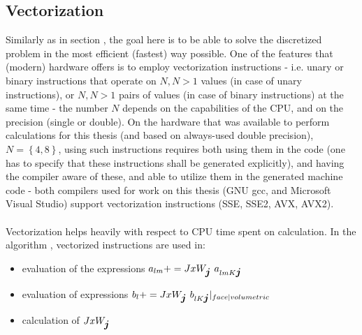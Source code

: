 \subsection{Vectorization}
Similarly as in section , the goal here is to be able to solve the discretized problem in the most efficient (fastest) way possible. One of the features that (modern) hardware offers is to employ vectorization instructions - i.e. unary or binary instructions that operate on $N, N > 1$ values (in case of unary instructions), or $N, N > 1$ pairs of values (in case of binary instructions) at the same time - the number $N$ depends on the capabilities of the CPU, and on the precision (single or double). On the hardware that was available to perform calculations for this thesis (and based on always-used double precision), $N = \left\{4, 8\right\}$, using such instructions requires both using them in the code (one has to specify that these instructions shall be generated explicitly), and having the compiler aware of these, and able to utilize them in the generated machine code - both compilers used for work on this thesis (GNU gcc, and Microsoft Visual Studio) support vectorization instructions (SSE, SSE2, AVX, AVX2).
\paragraph{}
Vectorization helps heavily with respect to CPU time spent on calculation. In the algorithm , vectorized instructions are used in:
\begin{itemize}
    \item evaluation of the expressions $a_{lm} += JxW_{\mbox{\boldmath $j$}} \ a_{lm K \mbox{\boldmath $j$}}$
    \item evaluation of expressions $b_{l} += JxW_{\mbox{\boldmath $j$}} \ b_{l K \mbox{\boldmath $j$}}|_{face|volumetric}$
    \item calculation of $JxW_{\mbox{\boldmath $j$}}$
\end{itemize}